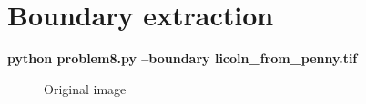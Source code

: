 \pagebreak

\section{Boundary extraction}

\textbf{python problem8.py --boundary licoln\_from\_penny.tif}

\begin{figure}[!htb]\centering
    \begin{minipage}{0.45\textwidth}
        \caption{\small{Original image}}
    \end{minipage}
    \begin{minipage}{0.45\textwidth}

\end{minipage}
\end{figure}
